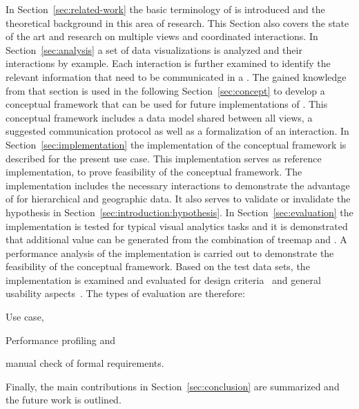 In Section~\ref{sec:related-work} the basic terminology of \cmvs{} is introduced and the theoretical background in this area of research.
This Section also covers the state of the art and research on multiple views and coordinated interactions.
In Section~\ref{sec:analysis} a set of data visualizations is analyzed and their interactions by example.
Each interaction is further examined to identify the relevant information that need to be communicated in a \cmv{}.
The gained knowledge from that section is used in the following Section~\ref{sec:concept} to develop a conceptual framework that can be used for future implementations of \cmvs{}.
This conceptual framework includes a data model shared between all views, a suggested communication protocol as well as a formalization of an interaction.
In Section~\ref{sec:implementation} the implementation of the conceptual framework is described for the present use case.
This implementation serves as reference implementation, to prove feasibility of the conceptual framework.
The implementation includes the necessary interactions to demonstrate the advantage of \cmvs{} for hierarchical and geographic data.
It also serves to validate or invalidate the hypothesis in Section~\ref{sec:introduction:hypothesis}.
In Section~\ref{sec:evaluation} the implementation is tested for typical visual analytics tasks and it is demonstrated that additional value can be generated from the combination of treemap and \gv{}.
A performance analysis of the implementation is carried out to demonstrate the feasibility of the conceptual framework.
Based on the test data sets, the \cmv{} implementation is examined and evaluated for design criteria~\parencite{Baldonado2000} and general usability aspects~\parencite{Roberts2007}.
The types of evaluation are therefore:

\begin{enumerate*}[label=(\arabic*)]
  \item Use case,
  \item Performance profiling and
  \item manual check of formal requirements.
\end{enumerate*}

Finally, the main contributions in Section~\ref{sec:conclusion} are summarized and the future work is outlined.

